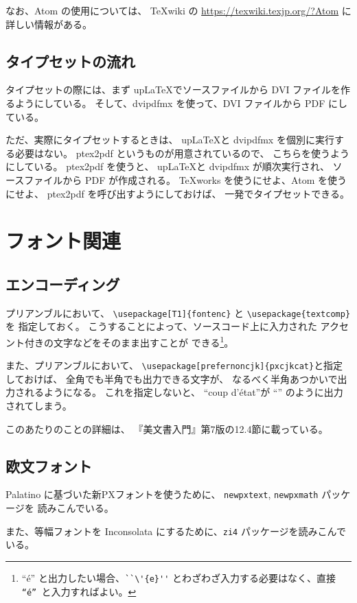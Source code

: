 \documentclass[ %
  uplatex,%
  a5paper,%
  papersize%
]{jsbook}
\begin{document}
なお、Atom の使用については、
\TeX wiki の \url{https://texwiki.texjp.org/?Atom} に詳しい情報がある。


\subsection{タイプセットの流れ}
タイプセットの際には、まず up\LaTeX でソースファイルから DVI ファイルを作るようにしている。
そして、dvipdfmx を使って、DVI ファイルから PDF にしている。

ただ、実際にタイプセットするときは、
up\LaTeX と dvipdfmx を個別に実行する必要はない。
ptex2pdf というものが用意されているので、
こちらを使うようにしている。
ptex2pdf を使うと、
up\LaTeX と dvipdfmx が順次実行され、
ソースファイルから PDF が作成される。
TeXworks を使うにせよ、Atom を使うにせよ、
ptex2pdf を呼び出すようにしておけば、
一発でタイプセットできる。


\section{フォント関連}

\subsection{エンコーディング}
プリアンブルにおいて、
\verb|\usepackage[T1]{fontenc}| と \verb|\usepackage{textcomp}| を
指定しておく。
こうすることによって、ソースコード上に入力された
アクセント付きの文字などをそのまま出すことが
できる\footnote{“é” と出力したい場合、\verb|``\'{e}''| とわざわざ入力する必要はなく、直接 \verb|“é” |と入力すればよい。}。

また、プリアンブルにおいて、
\verb|\usepackage[prefernoncjk]{pxcjkcat}|と指定しておけば、
全角でも半角でも出力できる文字が、
なるべく半角あつかいで出力されるようになる。
これを指定しないと、
“coup d’état”が
“”
のように出力されてしまう。

このあたりのことの詳細は、
『美文書入門』第7版の12.4節に載っている。

\subsection{欧文フォント}
Palatino に基づいた新PXフォントを使うために、
\texttt{newpxtext}, \texttt{newpxmath} パッケージを
読みこんでいる。

また、等幅フォントを Inconsolata にするために、\texttt{zi4} パッケージを読みこんでいる。
\end{document}
